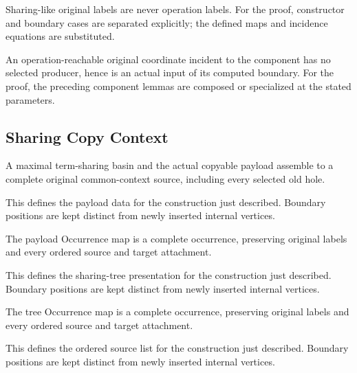Sharing-like original labels are never operation labels.
For the proof, constructor and boundary cases are separated explicitly; the defined maps and incidence equations are substituted.
\par{}

An operation-reachable original coordinate incident to the component has no selected producer, hence is an actual input of its computed boundary.
For the proof, the preceding component lemmas are composed or specialized at the stated parameters.
\par{}

\subsection{Sharing Copy Context}
A maximal term-sharing basin and the actual copyable payload assemble to a complete original common-context source, including every selected old hole.

This defines the payload data for the construction just described. Boundary positions are kept distinct from newly inserted internal vertices.
\par{}

The payload Occurrence map is a complete occurrence, preserving original labels and every ordered source and target attachment.
\par{}

This defines the sharing-tree presentation for the construction just described. Boundary positions are kept distinct from newly inserted internal vertices.
\par{}

The tree Occurrence map is a complete occurrence, preserving original labels and every ordered source and target attachment.
\par{}

This defines the ordered source list for the construction just described. Boundary positions are kept distinct from newly inserted internal vertices.
\par{}

